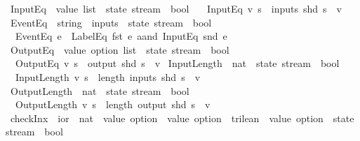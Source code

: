 \begin{isabellebody}
\isanewline
%
\endisadelimproof
\isanewline
{}\isamarkupfalse%
\ InputEq\ {\isacharcolon}{\isacharcolon}\ {\isachardoublequoteopen}value\ list\ {\isasymRightarrow}\ state\ stream\ {\isasymRightarrow}\ bool{\isachardoublequoteclose}\ \isanewline
\ \ {\isachardoublequoteopen}InputEq\ v\ s\ {\isasymequiv}\ inputs\ {\isacharparenleft}shd\ s{\isacharparenright}\ {\isacharequal}\ v{\isachardoublequoteclose}\isanewline
\isanewline
{}\isamarkupfalse%
\ EventEq\ {\isacharcolon}{\isacharcolon}\ {\isachardoublequoteopen}{\isacharparenleft}string\ {\isasymtimes}\ inputs{\isacharparenright}\ {\isasymRightarrow}\ state\ stream\ {\isasymRightarrow}\ bool{\isachardoublequoteclose}\ \isanewline
\ \ {\isachardoublequoteopen}EventEq\ e\ {\isacharequal}\ LabelEq\ {\isacharparenleft}fst\ e{\isacharparenright}\ aand\ InputEq\ {\isacharparenleft}snd\ e{\isacharparenright}{\isachardoublequoteclose}\isanewline
\isanewline
{}\isamarkupfalse%
\ OutputEq\ {\isacharcolon}{\isacharcolon}\ {\isachardoublequoteopen}value\ option\ list\ {\isasymRightarrow}\ state\ stream\ {\isasymRightarrow}\ bool{\isachardoublequoteclose}\ \isanewline
\ \ {\isachardoublequoteopen}OutputEq\ v\ s\ {\isasymequiv}\ output\ {\isacharparenleft}shd\ s{\isacharparenright}\ {\isacharequal}\ v{\isachardoublequoteclose}\isanewline
\isanewline
{}\isamarkupfalse%
\ InputLength\ {\isacharcolon}{\isacharcolon}\ {\isachardoublequoteopen}nat\ {\isasymRightarrow}\ state\ stream\ {\isasymRightarrow}\ bool{\isachardoublequoteclose}\ \isanewline
\ \ {\isachardoublequoteopen}InputLength\ v\ s\ {\isasymequiv}\ length\ {\isacharparenleft}inputs\ {\isacharparenleft}shd\ s{\isacharparenright}{\isacharparenright}\ {\isacharequal}\ v{\isachardoublequoteclose}\isanewline
\isanewline
{}\isamarkupfalse%
\ OutputLength\ {\isacharcolon}{\isacharcolon}\ {\isachardoublequoteopen}nat\ {\isasymRightarrow}\ state\ stream\ {\isasymRightarrow}\ bool{\isachardoublequoteclose}\ \isanewline
\ \ {\isachardoublequoteopen}OutputLength\ v\ s\ {\isasymequiv}\ length\ {\isacharparenleft}output\ {\isacharparenleft}shd\ s{\isacharparenright}{\isacharparenright}\ {\isacharequal}\ v{\isachardoublequoteclose}\isanewline
\isanewline
{}\isamarkupfalse%
\ {\isachardoublequoteopen}checkInx{\isachardoublequoteclose}\ {\isacharcolon}{\isacharcolon}\ {\isachardoublequoteopen}ior\ {\isasymRightarrow}\ nat\ {\isasymRightarrow}\ {\isacharparenleft}value\ option\ {\isasymRightarrow}\ value\ option\ {\isasymRightarrow}\ trilean{\isacharparenright}\ {\isasymRightarrow}\ value\ option\ {\isasymRightarrow}\ state\ stream\ {\isasymRightarrow}\ bool{\isachardoublequoteclose}\ \isanewline

\end{isabellebody}
